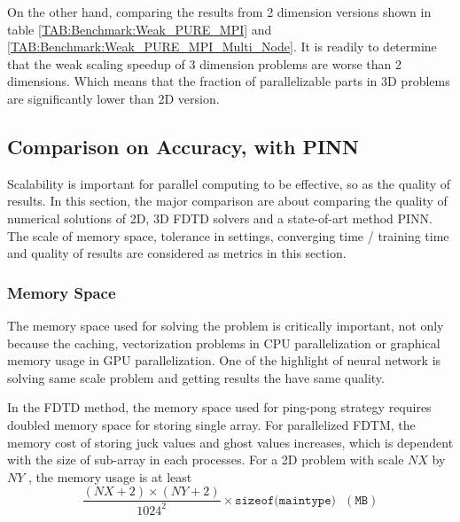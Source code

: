 On the other hand, comparing the results from 2 dimension versions shown in table \ref{TAB:Benchmark:Weak_PURE_MPI} and \ref{TAB:Benchmark:Weak_PURE_MPI_Multi_Node}.
It is readily to determine that the weak scaling speedup of 3 dimension problems are worse than 2 dimensions.
Which means that the fraction of parallelizable parts in 3D problems are significantly lower than 2D version.







\subsection{Comparison on Accuracy, with PINN}
Scalability is important for parallel computing to be effective, so as the quality of results.
In this section, the major comparison are about comparing the quality of numerical solutions of 
2D, 3D FDTD solvers and a state-of-art method PINN.
The scale of memory space, tolerance in settings, converging time / training time and quality of results are considered as metrics in this section.



\subsubsection{Memory Space}
The memory space used for solving the problem is critically important, not only because the caching, vectorization problems in CPU parallelization 
or graphical memory usage in GPU parallelization.
One of the highlight of neural network is solving same scale problem and getting results the have same quality.

In the FDTD method, the memory space used for ping-pong strategy requires doubled memory space for storing single array.
For parallelized FDTM, the memory cost of storing juck values and ghost values increases, which is dependent with the size of sub-array in each processes.
For a 2D problem with scale $NX$ by $NY$ , the memory usage is at least 
\begin{equation}
  \frac{(NX+2) \times (NY+2)}{1024^2} \times \texttt{sizeof(maintype)}\:\:\: (\texttt{MB})
\end{equation}

